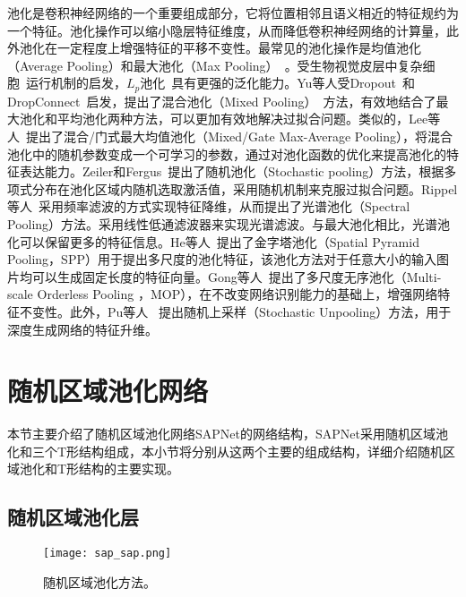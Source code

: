 池化是卷积神经网络的一个重要组成部分，它将位置相邻且语义相近的特征规约为一个特征。池化操作可以缩小隐层特征维度，从而降低卷积神经网络的计算量，此外池化在一定程度上增强特征的平移不变性。最常见的池化操作是均值池化（Average Pooling）和最大池化（Max Pooling）~\cite{weng1992cresceptron}。受生物视觉皮层中复杂细胞~\cite{weng1992cresceptron,simoncelli1998model}运行机制的启发，$L_{p}$池化~\cite{hyvarinen2007complex,bruna2013signal}具有更强的泛化能力。Yu等人受Dropout~\cite{hinton2012improving}和DropConnect~\cite{wan2013regularization}启发，提出了混合池化（Mixed Pooling）~\cite{yu2014mixed}方法，有效地结合了最大池化和平均池化两种方法，可以更加有效地解决过拟合问题。类似的，Lee等人~\cite{lee2015generalizing}提出了混合/门式最大均值池化（Mixed/Gate Max-Average Pooling），将混合池化中的随机参数变成一个可学习的参数，通过对池化函数的优化来提高池化的特征表达能力。Zeiler和Fergus~\cite{zeiler2013stochastic}提出了随机池化（Stochastic pooling）方法，根据多项式分布在池化区域内随机选取激活值，采用随机机制来克服过拟合问题。Rippel等人~\cite{rippel2015spectral}采用频率滤波的方式实现特征降维，从而提出了光谱池化（Spectral Pooling）方法。采用线性低通滤波器来实现光谱滤波。与最大池化相比，光谱池化可以保留更多的特征信息。He等人~\cite{he2014spatial}提出了金字塔池化（Spatial Pyramid Pooling，SPP）用于提出多尺度的池化特征，该池化方法对于任意大小的输入图片均可以生成固定长度的特征向量。Gong等人~\cite{gong2014multi}提出了多尺度无序池化（Multi-scale Orderless Pooling ，MOP），在不改变网络识别能力的基础上，增强网络特征不变性。此外，Pu等人~ \cite{pu2015deep}提出随机上采样（Stochastic Unpooling）方法，用于深度生成网络的特征升维。

\section{随机区域池化网络}
\label{sec:sap:model}

本节主要介绍了随机区域池化网络SAPNet的网络结构，SAPNet采用随机区域池化和三个T形结构组成，本小节将分别从这两个主要的组成结构，详细介绍随机区域池化和T形结构的主要实现。

\subsection{随机区域池化层}
\label{sec:sap:model:sap}

\begin{figure} [t]
\centering
\texttt{[image: sap\_sap.png]}
\caption{随机区域池化方法。}
\label{fig:sap_sap}
\end{figure}


